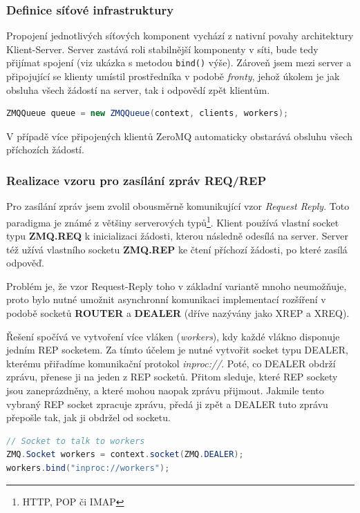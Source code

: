 \documentclass[thesis=M,czech]{FITthesis}[2014/05/07]
\begin{document}
\subsubsection{Definice síťové infrastruktury}
\label{subsub:queue}
Propojení jednotlivých síťových komponent vychází z nativní povahy architektury Klient-Server. Server zastává roli stabilnější komponenty v síti, bude tedy přijímat spojení (viz ukázka s metodou \texttt{bind()} výše). Zároveň jsem mezi server a připojující se klienty umístil prostředníka v podobě \emph{fronty}, jehož úkolem je jak obsluha všech žádostí na server, tak i odpovědí zpět klientům.

\begin{lstlisting}[language=java]
ZMQQueue queue = new ZMQQueue(context, clients, workers);
\end{lstlisting}

V případě více připojených klientů ZeroMQ automaticky obstarává obsluhu všech příchozích žádostí. 

\subsubsection{Realizace vzoru pro zasílání zpráv REQ/REP}
Pro zasílání zpráv jsem zvolil obousměrně komunikující vzor \emph{Request Reply}. Toto paradigma je známé z většiny serverových typů\footnote{HTTP, POP či IMAP}. Klient používá vlastní socket typu \textbf{ZMQ.REQ} k inicializaci žádosti, kterou následně odesílá na server. Server též užívá vlastního socketu \textbf{ZMQ.REP} ke čtení příchozí žádosti, po které zasílá odpověď. 

Problém je, že vzor Request-Reply toho v základní variantě mnoho neumožňuje, proto bylo nutné umožnit asynchronní komunikaci implementací rozšíření v podobě socketů \textbf{ROUTER} a \textbf{DEALER} (dříve nazývány jako XREP a XREQ). 

Řešení spočívá ve vytvoření více vláken (\emph{workers}), kdy každé vlákno disponuje jedním REP socketem. Za tímto účelem je nutné vytvořit socket typu DEALER, kterému přiřadíme komunikační protokol \emph{inproc://}. Poté, co DEALER obdrží zprávu, přenese ji na jeden z REP socketů. Přitom sleduje, které REP sockety jsou zaneprázdněny, a které mohou naopak zprávu přijmout. Jakmile tento vybraný REP socket zpracuje zprávu, předá ji zpět a DEALER tuto zprávu přepošle tak, jak ji obdržel od socketu.

\begin{lstlisting}[language=java]
// Socket to talk to workers
ZMQ.Socket workers = context.socket(ZMQ.DEALER);
workers.bind("inproc://workers");
\end{lstlisting}
\end{document}

